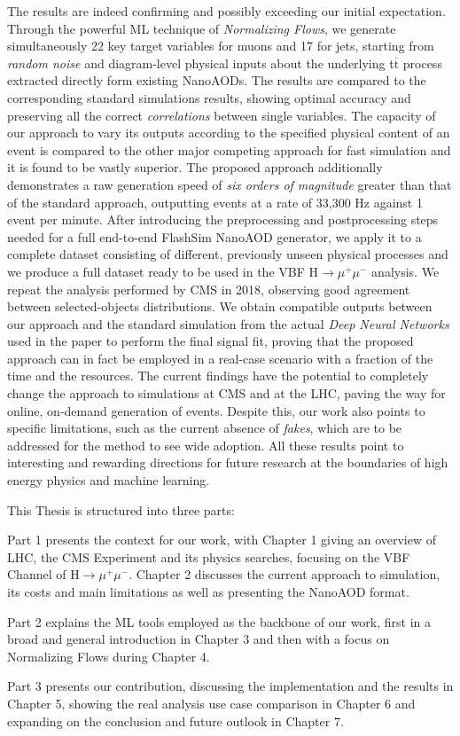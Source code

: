 The results are indeed confirming and possibly exceeding our initial expectation. Through the powerful ML technique of \emph{Normalizing Flows}, we generate simultaneously 22 key target variables for muons and 17 for jets, starting from \emph{random noise} and diagram-level physical inputs about the underlying t$\overline{\text{t}}$ process extracted directly form existing NanoAODs. The results are compared to the corresponding standard simulations results, showing optimal accuracy and preserving all the correct \emph{correlations} between single variables. 
The capacity of our approach to vary its outputs according to the specified physical content of an event is compared to the other major competing approach for fast simulation and it is found to be vastly superior. The proposed approach additionally demonstrates a raw generation speed of \emph{six orders of magnitude} greater than that of the standard approach, outputting events at a rate of 33,300 Hz against 1 event per minute. After introducing the preprocessing and postprocessing steps needed for a full end-to-end FlashSim NanoAOD generator, we apply it to a complete dataset consisting of different, previously unseen physical processes and we produce a full dataset ready to be used in the VBF H$\rightarrow\mu^+\mu^-$ analysis. We repeat the analysis performed by CMS in 2018, observing good agreement between selected-objects distributions. We obtain compatible outputs between our approach and the standard simulation from the actual \emph{Deep Neural Networks} used in the paper to perform the final signal fit, proving that the proposed approach can in fact be employed in a real-case scenario with a fraction of the time and the resources.
The current findings have the potential to completely change the approach to simulations at CMS and at the LHC, paving the way for online, on-demand generation of events. Despite this, our work also points to specific limitations, such as the current absence of \emph{fakes}, which are to be addressed for the method to see wide adoption. All these results point to interesting and rewarding directions for future research at the boundaries of high energy physics and machine learning.

This Thesis is structured into three parts:

Part 1 presents the context for our work, with Chapter 1 giving an overview of LHC, the CMS Experiment and its physics searches, focusing on the VBF Channel of H$\rightarrow\mu^+\mu^-$. Chapter 2 discusses the current approach to simulation, its costs and main limitations as well as presenting the NanoAOD format.

Part 2 explains the ML tools employed as the backbone of our work, first in a broad and general introduction in Chapter 3 and then with a focus on Normalizing Flows during Chapter 4.

Part 3 presents our contribution, discussing the implementation and the results in Chapter 5, showing the real analysis use case comparison in Chapter 6 and expanding on the conclusion and future outlook in Chapter 7. 
\endgroup

\vfill
